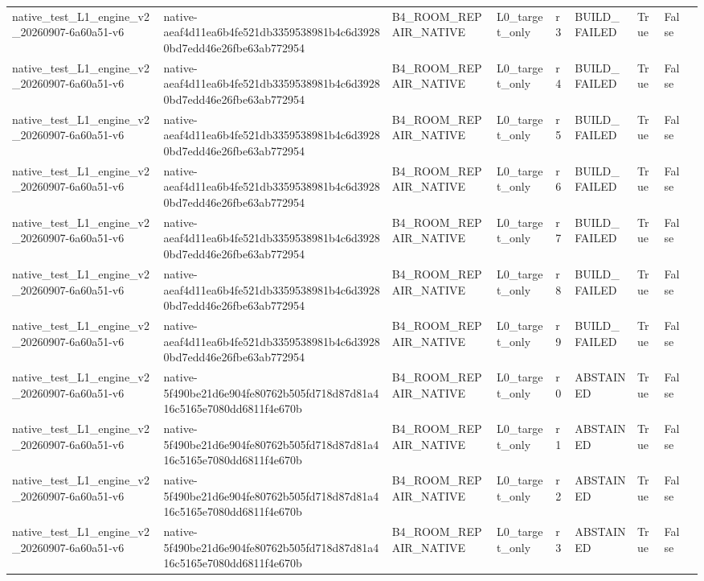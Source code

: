 \begin{tabular}{lllllllll}
native\_test\_L1\_engine\_v2\_20260907-6a60a51-v6 & native-aeaf4d11ea6b4fe521db3359538981b4c6d39280bd7edd46e26fbe63ab772954 & B4\_ROOM\_REPAIR\_NATIVE & L0\_target\_only & r3 & BUILD\_FAILED & True & False &  \\
native\_test\_L1\_engine\_v2\_20260907-6a60a51-v6 & native-aeaf4d11ea6b4fe521db3359538981b4c6d39280bd7edd46e26fbe63ab772954 & B4\_ROOM\_REPAIR\_NATIVE & L0\_target\_only & r4 & BUILD\_FAILED & True & False &  \\
native\_test\_L1\_engine\_v2\_20260907-6a60a51-v6 & native-aeaf4d11ea6b4fe521db3359538981b4c6d39280bd7edd46e26fbe63ab772954 & B4\_ROOM\_REPAIR\_NATIVE & L0\_target\_only & r5 & BUILD\_FAILED & True & False &  \\
native\_test\_L1\_engine\_v2\_20260907-6a60a51-v6 & native-aeaf4d11ea6b4fe521db3359538981b4c6d39280bd7edd46e26fbe63ab772954 & B4\_ROOM\_REPAIR\_NATIVE & L0\_target\_only & r6 & BUILD\_FAILED & True & False &  \\
native\_test\_L1\_engine\_v2\_20260907-6a60a51-v6 & native-aeaf4d11ea6b4fe521db3359538981b4c6d39280bd7edd46e26fbe63ab772954 & B4\_ROOM\_REPAIR\_NATIVE & L0\_target\_only & r7 & BUILD\_FAILED & True & False &  \\
native\_test\_L1\_engine\_v2\_20260907-6a60a51-v6 & native-aeaf4d11ea6b4fe521db3359538981b4c6d39280bd7edd46e26fbe63ab772954 & B4\_ROOM\_REPAIR\_NATIVE & L0\_target\_only & r8 & BUILD\_FAILED & True & False &  \\
native\_test\_L1\_engine\_v2\_20260907-6a60a51-v6 & native-aeaf4d11ea6b4fe521db3359538981b4c6d39280bd7edd46e26fbe63ab772954 & B4\_ROOM\_REPAIR\_NATIVE & L0\_target\_only & r9 & BUILD\_FAILED & True & False &  \\
native\_test\_L1\_engine\_v2\_20260907-6a60a51-v6 & native-5f490be21d6e904fe80762b505fd718d87d81a416c5165e7080dd6811f4e670b & B4\_ROOM\_REPAIR\_NATIVE & L0\_target\_only & r0 & ABSTAINED & True & False &  \\
native\_test\_L1\_engine\_v2\_20260907-6a60a51-v6 & native-5f490be21d6e904fe80762b505fd718d87d81a416c5165e7080dd6811f4e670b & B4\_ROOM\_REPAIR\_NATIVE & L0\_target\_only & r1 & ABSTAINED & True & False &  \\
native\_test\_L1\_engine\_v2\_20260907-6a60a51-v6 & native-5f490be21d6e904fe80762b505fd718d87d81a416c5165e7080dd6811f4e670b & B4\_ROOM\_REPAIR\_NATIVE & L0\_target\_only & r2 & ABSTAINED & True & False &  \\
native\_test\_L1\_engine\_v2\_20260907-6a60a51-v6 & native-5f490be21d6e904fe80762b505fd718d87d81a416c5165e7080dd6811f4e670b & B4\_ROOM\_REPAIR\_NATIVE & L0\_target\_only & r3 & ABSTAINED & True & False &  \\

\end{tabular}
